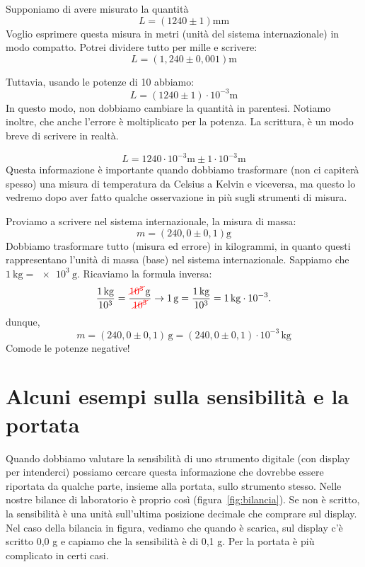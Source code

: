 \begin{testexample}
Supponiamo di avere misurato la quantità
\[
L=\left(1240\pm1\right)\si{\milli\meter}
\]
Voglio esprimere questa misura in metri (unità del sistema internazionale) in modo compatto. Potrei dividere tutto per mille e scrivere:
\[
L=\left(1,240\pm 0,001\right)\si{\meter}
\]

Tuttavia, usando le potenze di 10 abbiamo:
\[
L=\left(1240\pm 1\right)\cdot 10^{-3}\si{\meter}
\]
In questo modo, non dobbiamo cambiare la quantità in parentesi. Notiamo inoltre, che anche l'errore è moltiplicato per la potenza. La scrittura, è un modo breve di scrivere in realtà.

\[
L= 1240\cdot 10^{-3}\si{\meter} \pm 1\cdot 10^{-3}\si{\meter}
\]
Questa informazione è importante quando dobbiamo trasformare (non ci capiterà spesso) una misura di temperatura da Celsius a Kelvin e viceversa, ma questo lo vedremo dopo aver fatto qualche osservazione in più sugli strumenti di misura.

Proviamo a scrivere nel sistema internazionale, la misura di massa:
\[
m=\left(240,0\pm 0,1\right)\si{\gram}
\]
Dobbiamo trasformare tutto (misura ed errore) in kilogrammi, in quanto questi rappresentano l'unità di massa (base) nel sistema internazionale. Sappiamo che $\SI{1}{\kilo\gram}=\SI{e3}{\gram}$. Ricaviamo la formula inversa:
\[
\frac{\SI{1}{\kilo\gram}}{10^3} = \frac{\textcolor{red}{\cancel{10^3}}\,\si{\gram}}{\textcolor{red}{\cancel{10^3}}} \rightarrow \SI{1}{\gram} = \frac{\SI{1}{\kilo\gram}}{10^3} = \SI{1}{\kilo\gram}\cdot 10^{-3}. 
\]
dunque,
\[
m=\left(240,0\pm 0,1\right)\,\si{\gram} = \left(240,0\pm 0,1\right)\cdot 10^{-3}\,\si{\kilo\gram}
\]
Comode le potenze negative!


\end{testexample}

\section{Alcuni esempi sulla sensibilità e la portata}
Quando dobbiamo valutare la sensibilità di uno strumento digitale (con display per intenderci) possiamo cercare questa informazione che dovrebbe essere riportata da qualche parte, insieme alla portata, sullo strumento stesso. Nelle nostre bilance di laboratorio è proprio così (figura~\ref{fig:bilancia}). Se non è scritto, la sensibilità è una unità sull'ultima posizione decimale che comprare sul display. Nel caso della bilancia in figura, vediamo che quando è scarica, sul display c'è scritto 0,0 g e capiamo che la sensibilità è di 0,1 g. Per la portata è più complicato in certi casi. 

